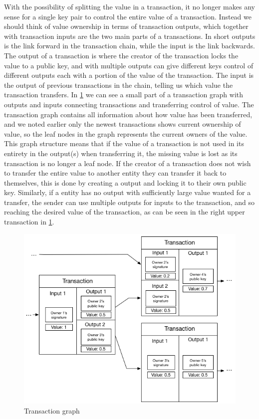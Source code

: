 With the possibility of splitting the value in a transaction, it no longer makes any sense for a single key pair to control the entire value of a transaction. Instead we should think of value ownership in terms of transaction outputs, which together with transaction inputs are the two main parts of a transactions. In short outputs is the link forward in the transaction chain, while the input is the link backwards. The output of a transaction is where the creator of the transaction locks the value to a public key, and with multiple outputs can give different keys control of different outputs each with a portion of the value of the transaction. The input is the output of previous transactions in the chain, telling us which value the transaction transfers. In \cref{fig:transaction_graph} we can see a small part of a transaction graph with outputs and inputs connecting transactions and transferring control of value. The transaction graph contains all information about how value has been transferred, and we noted earlier only the newest transactions shows current ownership of value, so the leaf nodes in the graph represents the current owners of the value.
This graph structure means that if the value of a transaction is not used in its entirety in the output(s) when transferring it, the missing value is lost as its transaction is no longer a leaf node. If the creator of a transaction does not wish to transfer the entire value to another entity they can transfer it back to themselves, this is done by creating a output and locking it to their own public key. Similarly, if a entity has no output with sufficiently large value wanted for a transfer, the sender can use multiple outputs for inputs to the transaction, and so reaching the desired value of the transaction, as can be seen in the right upper transaction in \cref{fig:transaction_graph}.


\begin{figure}[h]  %
  \centering
  \includegraphics[width=.7\textwidth]{figures/transaction}
  \caption[Transaction chain]{Transaction graph}
  \label{fig:transaction_graph}
\end{figure}


